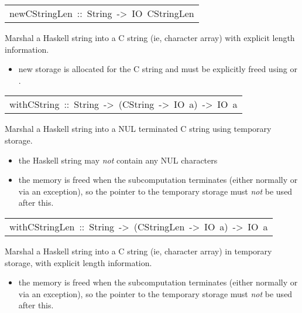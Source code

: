 \begin{haddockdesc}
\item[\begin{tabular}{@{}l}
newCStringLen\ ::\ String\ ->\ IO\ CStringLen
\end{tabular}]\haddockbegindoc
Marshal a Haskell string into a C string (ie, character array) with
 explicit length information.
\par
\begin{itemize}
\item
 new storage is allocated for the C string and must be
   explicitly freed using  or
   .
\par

\end{itemize}

\end{haddockdesc}
\begin{haddockdesc}
\item[\begin{tabular}{@{}l}
withCString\ ::\ String\ ->\ (CString\ ->\ IO\ a)\ ->\ IO\ a
\end{tabular}]\haddockbegindoc
Marshal a Haskell string into a NUL terminated C string using temporary
 storage.
\par
\begin{itemize}
\item
 the Haskell string may \emph{not} contain any NUL characters
\par

\item
 the memory is freed when the subcomputation terminates (either
   normally or via an exception), so the pointer to the temporary
   storage must \emph{not} be used after this.
\par

\end{itemize}

\end{haddockdesc}
\begin{haddockdesc}
\item[\begin{tabular}{@{}l}
withCStringLen\ ::\ String\ ->\ (CStringLen\ ->\ IO\ a)\ ->\ IO\ a
\end{tabular}]\haddockbegindoc
Marshal a Haskell string into a C string (ie, character array)
 in temporary storage, with explicit length information.
\par
\begin{itemize}
\item
 the memory is freed when the subcomputation terminates (either
   normally or via an exception), so the pointer to the temporary
   storage must \emph{not} be used after this.
\par

\end{itemize}

\end{haddockdesc}
